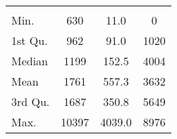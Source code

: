 \begin{tabular}{lS[table-format=5.1]S[table-format=5.1]S[table-format=5.1]}
&  &  &  \\
 Min.    & 630 & 11.0 & 0 \\
 1st Qu. & 962 & 91.0 & 1020 \\
 Median  & 1199 & 152.5 & 4004 \\
 Mean    & 1761 & 557.3 & 3632 \\
 3rd Qu. & 1687 & 350.8 & 5649 \\
 Max.    & 10397 & 4039.0 & 8976 \\
\end{tabular}
